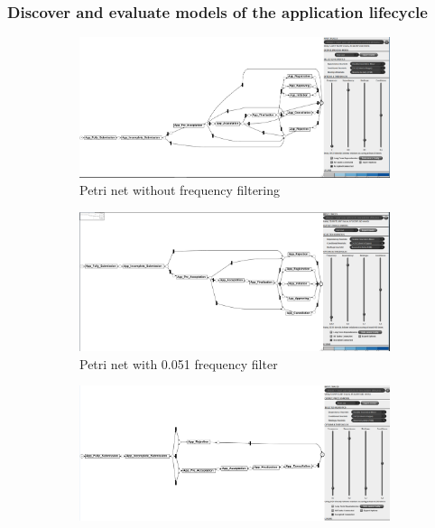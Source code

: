 \subsubsection{Discover and evaluate models of the application lifecycle}

\begin{figure}[!htbp]
\centering
\begin{subfigure}{.4\textwidth}
  \centering
  \includegraphics[width=\linewidth]{App_DirectlyFollowedFreq0.PNG}
  \caption{Petri net without frequency filtering}
  \label{fig:APP_DFG0}
\end{subfigure}%
\begin{subfigure}{.4\textwidth}
  \centering
  \includegraphics[width=\linewidth]{App_DirectlyFollowedFreq0-051.PNG}
  \caption{Petri net with 0.051 frequency filter}
  \label{fig:APP_DFG0-51}
\end{subfigure}
\begin{subfigure}{.4\textwidth}
  \centering
  \includegraphics[width=\linewidth]{App_DirectlyFollowedFreq0-1.PNG}

\end{subfigure}
\end{figure}
